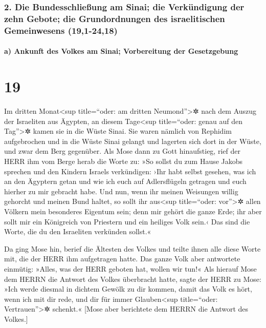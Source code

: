 \hypertarget{die-bundesschlieuxdfung-am-sinai-die-verkuxfcndigung-der-zehn-gebote-die-grundordnungen-des-israelitischen-gemeinwesens-191-2418}{%
\subsubsection{2. Die Bundesschließung am Sinai; die Verkündigung der
zehn Gebote; die Grundordnungen des israelitischen Gemeinwesens
(19,1-24,18)}\label{die-bundesschlieuxdfung-am-sinai-die-verkuxfcndigung-der-zehn-gebote-die-grundordnungen-des-israelitischen-gemeinwesens-191-2418}}

\hypertarget{a-ankunft-des-volkes-am-sinai-vorbereitung-der-gesetzgebung}{%
\paragraph{a) Ankunft des Volkes am Sinai; Vorbereitung der
Gesetzgebung}\label{a-ankunft-des-volkes-am-sinai-vorbereitung-der-gesetzgebung}}

\hypertarget{section-18}{%
\section{19}\label{section-18}}

 Im dritten Monat\textless sup title=``oder: am dritten
Neumond''\textgreater✲ nach dem Auszug der Israeliten aus Ägypten, an
diesem Tage\textless sup title=``oder: genau auf den Tag''\textgreater✲
kamen sie in die Wüste Sinai.  Sie waren nämlich von
Rephidim aufgebrochen und in die Wüste Sinai gelangt und lagerten sich
dort in der Wüste, und zwar dem Berg gegenüber.  Als Mose
dann zu Gott hinaufstieg, rief der HERR ihm vom Berge herab die Worte
zu: »So sollst du zum Hause Jakobs sprechen und den Kindern Israels
verkündigen:  ›Ihr habt selbst gesehen, was ich an den
Ägyptern getan und wie ich euch auf Adlersflügeln getragen und euch
hierher zu mir gebracht habe.  Und nun, wenn ihr meinen
Weisungen willig gehorcht und meinen Bund haltet, so sollt ihr
aus\textless sup title=``oder: vor''\textgreater✲ allen Völkern mein
besonderes Eigentum sein; denn mir gehört die ganze Erde; 
ihr aber sollt mir ein Königreich von Priestern und ein heiliges Volk
sein.‹ Das sind die Worte, die du den Israeliten verkünden sollst.«

 Da ging Mose hin, berief die Ältesten des Volkes und
teilte ihnen alle diese Worte mit, die der HERR ihm aufgetragen hatte.
 Das ganze Volk aber antwortete einmütig: »Alles, was der
HERR geboten hat, wollen wir tun!« Als hierauf Mose dem HERRN die
Antwort des Volkes überbracht hatte,  sagte der HERR zu
Mose: »Ich werde diesmal in dichtem Gewölk zu dir kommen, damit das Volk
es hört, wenn ich mit dir rede, und dir für immer Glauben\textless sup
title=``oder: Vertrauen''\textgreater✲ schenkt.« {[}Mose aber berichtete
dem HERRN die Antwort des Volkes.{]}

